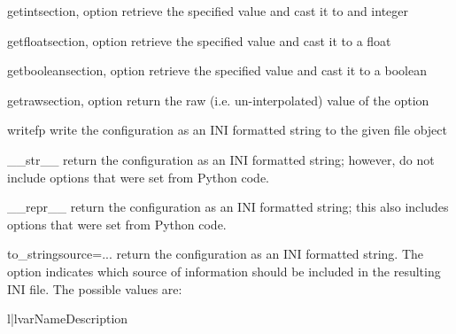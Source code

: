 \documentclass{manual}
\begin{document}
\begin{methoddesc}[ConfigManager]{getint}{section, option}
retrieve the specified value and cast it to and integer
\end{methoddesc}

\begin{methoddesc}[ConfigManager]{getfloat}{section, option}
retrieve the specified value and cast it to a float
\end{methoddesc}

\begin{methoddesc}[ConfigManager]{getboolean}{section, option}
retrieve the specified value and cast it to a boolean
\end{methoddesc}

\begin{methoddesc}[ConfigManager]{getraw}{section, option}
return the raw (i.e. un-interpolated) value of the option
\end{methoddesc}

\begin{methoddesc}[ConfigManager]{write}{fp}
write the configuration as an INI formatted string to the given file object
\end{methoddesc}

\begin{methoddesc}[ConfigManager]{\_\_str\_\_}{}
return the configuration as an INI formatted string; however, do not 
include options that were set from Python code.
\end{methoddesc}

\begin{methoddesc}[ConfigManager]{\_\_repr\_\_}{}
return the configuration as an INI formatted string; this also includes 
options that were set from Python code.
\end{methoddesc}

\begin{methoddesc}[ConfigManager]{to\_string}{source=...}
return the configuration as an INI formatted string.  The 
option indicates which source of information should be included in
the resulting INI file.  The possible values are:
\begin{tableii}{l|l}{var}{Name}{Description}
\end{tableii}
\end{methoddesc}
\end{document}
